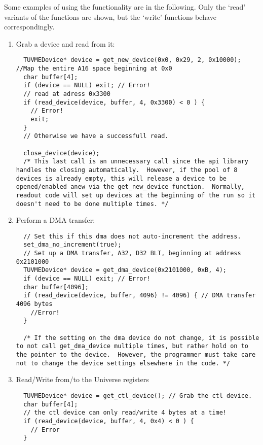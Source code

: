 Some examples of using the functionality are in the following.  Only the `read' variants of the functions are shown, but
the `write' functions behave correspondingly.
			\begin{enumerate}
			\item Grab a device and read from it:
				\begin{lstlisting}
  TUVMEDevice* device = get_new_device(0x0, 0x29, 2, 0x10000); //Map the entire A16 space beginning at 0x0
  char buffer[4];
  if (device == NULL) exit; // Error!
  // read at adress 0x3300 
  if (read_device(device, buffer, 4, 0x3300) < 0 ) { 
    // Error!
    exit;
  }
  // Otherwise we have a successfull read.

  close_device(device);  
  /* This last call is an unnecessary call since the api library handles the closing automatically.  However, if the pool of 8 devices is already empty, this will release a device to be opened/enabled anew via the get_new_device function.  Normally, readout code will set up devices at the beginning of the run so it doesn't need to be done multiple times. */

				\end{lstlisting}
			\item Perform a DMA transfer:
				\begin{lstlisting}
  // Set this if this dma does not auto-increment the address.
  set_dma_no_increment(true); 
  // Set up a DMA transfer, A32, D32 BLT, beginning at address 0x2101000
  TUVMEDevice* device = get_dma_device(0x2101000, 0xB, 4); 
  if (device == NULL) exit; // Error!
  char buffer[4096]; 
  if (read_device(device, buffer, 4096) != 4096) { // DMA transfer 4096 bytes
    //Error!
  }

  /* If the setting on the dma device do not change, it is possible to not call get_dma_device multiple times, but rather hold on to the pointer to the device.  However, the programmer must take care not to change the device settings elsewhere in the code. */
				\end{lstlisting}
  			\item Read/Write from/to the Universe registers

				\begin{lstlisting}
  TUVMEDevice* device = get_ctl_device(); // Grab the ctl device. 
  char buffer[4];
  // the ctl device can only read/write 4 bytes at a time!
  if (read_device(device, buffer, 4, 0x4) < 0 ) { 
    // Error
  } 
				\end{lstlisting}

			\end{enumerate}



